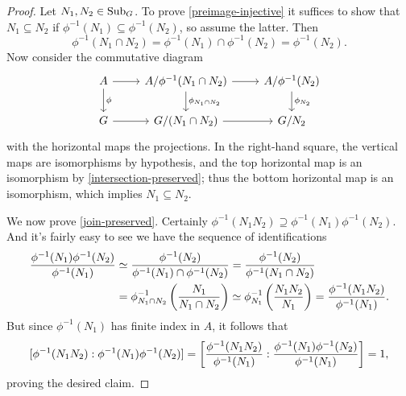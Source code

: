 \begin{proof}
  Let $N_1,N_2 \in \operatorname{Sub}_G$. To prove \eqref{preimage-injective} it suffices to show that $N_1 \subseteq N_2$ if $\phi^{-1}(N_1) \subseteq \phi^{-1}(N_2)$, so assume the latter. Then
  \begin{equation}
    \label{intersection-preserved}
    \phi^{-1}(N_1 \cap N_2) = \phi^{-1}(N_1) \cap \phi^{-1}(N_2) =
    \phi^{-1}(N_2).
  \end{equation}
  Now consider the commutative diagram
  \[
  \begin{tikzcd}
    A \ar[d, "\phi"] \ar[r] &
    A/\phi^{-1}(N_1 \cap N_2) \ar[d, "\phi_{N_1 \cap N_2}"] \ar[r] &
    A/\phi^{-1}(N_2) \ar[d, "\phi_{N_2}"] \\
    G \ar[r] & G/(N_1 \cap N_2) \ar[r] & G/N_2
  \end{tikzcd}
  \]
  with the horizontal maps the projections. In the right-hand square, the vertical maps are isomorphisms by hypothesis, and the top horizontal map is an isomorphism by \eqref{intersection-preserved}; thus the bottom horizontal map is an isomorphism, which implies $N_1 \subseteq N_2$.

  We now prove \eqref{join-preserved}. Certainly $\phi^{-1}(N_1N_2) \supseteq \phi^{-1}(N_1)\phi^{-1}(N_2)$. And it's fairly easy to see we have the sequence of identifications
  \begin{align*}
    \frac{\phi^{-1}(N_1)\phi^{-1}(N_2)}{\phi^{-1}(N_1)}
    & \simeq \frac{\phi^{-1}(N_2)}{\phi^{-1}(N_1) \cap \phi^{-1}(N_2)}
      = \frac{\phi^{-1}(N_2)}{\phi^{-1}(N_1 \cap N_2)} \\
    & = \phi_{N_1 \cap N_2}^{-1}\left( \frac{N_1}{N_1 \cap N_2} \right)
      \simeq \phi_{N_1}^{-1}\left( \frac{N_1N_2}{N_1} \right)
      = \frac{\phi^{-1}(N_1N_2)}{\phi^{-1}(N_1)}.
  \end{align*}
  But since $\phi^{-1}(N_1)$ has finite index in $A$, it follows that
  \[
  [\phi^{-1}(N_1N_2) : \phi^{-1}(N_1)\phi^{-1}(N_2)] = \left[
  \frac{\phi^{-1}(N_1N_2)}{\phi^{-1}(N_1)} :
  \frac{\phi^{-1}(N_1)\phi^{-1}(N_2)}{\phi^{-1}(N_1)} \right] = 1,
  \]
  proving the desired claim.
\end{proof}

